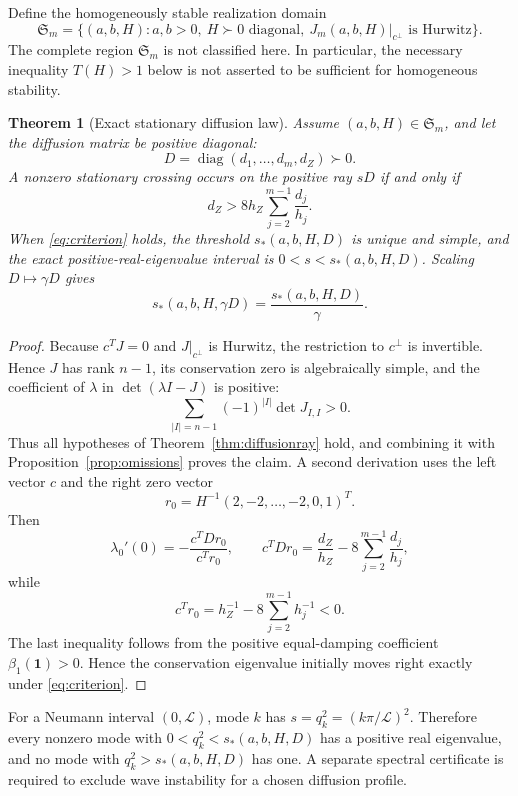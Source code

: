 \documentclass[11pt]{article}
\newtheorem{theorem}{Theorem}[section]
\theoremstyle{definition}
\newcommand{\diag}{\operatorname{diag}}
\newcommand{\1}{\mathbf 1}
\begin{document}
Define the homogeneously stable realization domain
\begin{equation}\label{eq:stable-domain}
 \mathfrak S_m=\{(a,b,H):a,b>0,\ H\succ0\text{ diagonal},\
 J_m(a,b,H)|_{c^\perp}\text{ is Hurwitz}\}.
\end{equation}
The complete region $\mathfrak S_m$ is not classified here.  In
particular, the necessary inequality $T(H)>1$ below is not asserted to be
sufficient for homogeneous stability.

\begin{theorem}[Exact stationary diffusion law]\label{thm:diffusionlaw}
Assume $(a,b,H)\in\mathfrak S_m$, and let the diffusion matrix be positive
diagonal:
\[
 D=\diag(d_1,\ldots,d_m,d_Z)\succ0.
\]
A nonzero
stationary crossing occurs on the positive ray $sD$ if and only if
\begin{equation}\label{eq:criterion}
 \boxed{\quad d_Z>8h_Z\sum_{j=2}^{m-1}\frac{d_j}{h_j}.\quad}
\end{equation}
When \eqref{eq:criterion} holds, the threshold $s_*(a,b,H,D)$ is unique and
simple, and the exact positive-real-eigenvalue interval is
$0<s<s_*(a,b,H,D)$.  Scaling $D\mapsto\gamma D$ gives
\[
 s_*(a,b,H,\gamma D)=\frac{s_*(a,b,H,D)}{\gamma}.
\]
\end{theorem}

\begin{proof}
Because $c^TJ=0$ and $J|_{c^\perp}$ is Hurwitz, the restriction to
$c^\perp$ is invertible.  Hence $J$ has rank $n-1$, its conservation zero is
algebraically simple, and the coefficient of $\lambda$ in
$\det(\lambda I-J)$ is positive:
\[
 \sum_{|I|=n-1}(-1)^{|I|}\det J_{I,I}>0.
\]
Thus all hypotheses of Theorem~\ref{thm:diffusionray} hold, and combining it
with Proposition~\ref{prop:omissions} proves the claim.  A second derivation
uses the left vector $c$ and the right zero vector
\[
 r_0=H^{-1}(2,-2,\ldots,-2,0,1)^T.
\]
Then
\[
 \lambda_0'(0)=-\frac{c^TDr_0}{c^Tr_0},\qquad
 c^TDr_0=\frac{d_Z}{h_Z}-8\sum_{j=2}^{m-1}\frac{d_j}{h_j},
\]
while
\[
 c^Tr_0=h_Z^{-1}-8\sum_{j=2}^{m-1}h_j^{-1}<0.
\]
The last inequality follows
from the positive equal-damping coefficient $\beta_1(\1)>0$.  Hence the
conservation eigenvalue initially moves right exactly under
\eqref{eq:criterion}.
\end{proof}

For a Neumann interval $(0,\mathcal L)$, mode $k$ has
$s=q_k^2=(k\pi/\mathcal L)^2$.
Therefore every nonzero mode with
$0<q_k^2<s_*(a,b,H,D)$ has a positive real eigenvalue, and no mode with
$q_k^2>s_*(a,b,H,D)$ has one.  A separate spectral certificate is required to
exclude wave instability for a chosen diffusion profile.
\end{document}
